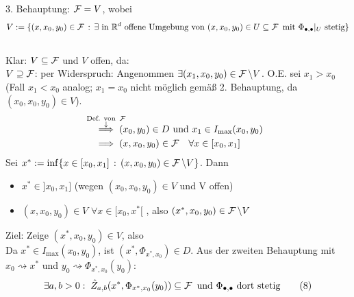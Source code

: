 \documentclass[a4paper]{article}
\begin{document}
\begin{Beweis}
{{3. Behauptung: $\operatorname{\mathcal{F}}=V$, wobei
\[V:=\{(x,x_0,y_0)\in\operatorname{\mathcal{F}}\,:\,\exists\text{ in $\mathbb R^d$ offene Umgebung von }(x,x_0,y_0)\in U\subseteq\operatorname{\mathcal{F}} \text{ mit }\Phi_{\bullet,\bullet}|_{U}\text{ stetig}\}\]
}
}
\vspace{0.5mm}\\
Klar: $V\subseteq \operatorname{\mathcal{F}}$ und $V$ offen, da:
\\
\glqq$V\supseteq \operatorname{\mathcal{F}}$\grqq: per Widerspruch: Angenommen $\exists (x_1,x_0,y_0)\in\operatorname{\mathcal{F}}\setminus V$. O.E. sei $x_1>x_0$ (Fall $x_1<x_0$ analog; $x_1=x_0$ nicht möglich gemäß 2. Behauptung, da $(x_0,x_0,y_0)\in V$). 
\begin{align*}
&\overset{\mathclap{\substack{\text{Def. von }\FF\\\downarrow}}}{\implies} (x_0,y_0)\in D\te{und }x_1\in I_{\max}(x_0,y_0)\\
&\implies(x,x_0,y_0)\in \FF\;\;\;\forall x\in[x_0,x_1]
\end{align*}
Sei $x^*:=\inf\{x\in [x_0,x_1]\,:\,(x,x_0,y_0)\in\operatorname{\mathcal{F}}\setminus V\}$. Dann
\begin{itemize}
\item $x^*\in]x_0,x_1]$ (wegen $(x_0,x_0,y_0)\in V$ und V offen)
\item $(x,x_0,y_0)\in V$ $\forall x\in [x_0,x^*[$	, also $(x^*,x_0,y_0)\in\operatorname{\mathcal{F}}\setminus V$
\end{itemize}
Ziel: Zeige $(x^*,x_0,y_0)\in V$, also \lightning\\
Da $x^*\in I_{\max}(x_0,y_0)$, ist $(x^*,\Phi_{x^*,x_0})\in D$. Aus der zweiten Behauptung mit $x_0\rightsquigarrow x^*$ und $y_0\rightsquigarrow \Phi_{x^*,x_0}(y_0)$:
\[\exists a,b>0:\;\hat{Z}_{a,b}(x^*,\Phi_{x^*,x_0}(y_0))\subseteq\operatorname{\mathcal{F}}\text{ und }\Phi_{\bullet,\bullet}\text{ dort stetig}\tag{$8$}\label{(8)}\]

\end{Beweis}
\end{document}
